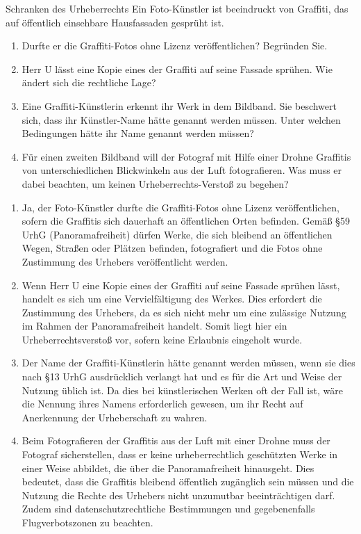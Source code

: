 \documentclass{article}
\begin{document}
\begin{exercise}{Schranken des Urheberrechts}
  Ein Foto-Künstler ist beeindruckt von Graffiti, das auf öffentlich einsehbare Hausfassaden gesprüht ist.
  \begin{enumerate}
    \item Durfte er die Graffiti-Fotos ohne Lizenz veröffentlichen? Begründen Sie.
    \item Herr U lässt eine Kopie eines der Graffiti auf seine Fassade sprühen. Wie ändert sich die rechtliche Lage?
    \item Eine Graffiti-Künstlerin erkennt ihr Werk in dem Bildband. Sie beschwert sich, dass ihr Künstler-Name hätte genannt werden müssen. Unter welchen Bedingungen hätte ihr Name genannt werden müssen?
    \item Für einen zweiten Bildband will der Fotograf mit Hilfe einer Drohne Graffitis von unterschiedlichen Blickwinkeln aus der Luft fotografieren. Was muss er dabei beachten, um keinen Urheberrechts-Verstoß zu begehen?
  \end{enumerate}

  \begin{solution}
    \begin{enumerate}
      \item Ja, der Foto-Künstler durfte die Graffiti-Fotos ohne Lizenz veröffentlichen, sofern die Graffitis sich dauerhaft an öffentlichen Orten befinden. Gemäß §59 UrhG (Panoramafreiheit) dürfen Werke, die sich bleibend an öffentlichen Wegen, Straßen oder Plätzen befinden, fotografiert und die Fotos ohne Zustimmung des Urhebers veröffentlicht werden.
      \item Wenn Herr U eine Kopie eines der Graffiti auf seine Fassade sprühen lässt, handelt es sich um eine Vervielfältigung des Werkes. Dies erfordert die Zustimmung des Urhebers, da es sich nicht mehr um eine zulässige Nutzung im Rahmen der Panoramafreiheit handelt. Somit liegt hier ein Urheberrechtsverstoß vor, sofern keine Erlaubnis eingeholt wurde.
      \item Der Name der Graffiti-Künstlerin hätte genannt werden müssen, wenn sie dies nach §13 UrhG ausdrücklich verlangt hat und es für die Art und Weise der Nutzung üblich ist. Da dies bei künstlerischen Werken oft der Fall ist, wäre die Nennung ihres Namens erforderlich gewesen, um ihr Recht auf Anerkennung der Urheberschaft zu wahren.
      \item Beim Fotografieren der Graffitis aus der Luft mit einer Drohne muss der Fotograf sicherstellen, dass er keine urheberrechtlich geschützten Werke in einer Weise abbildet, die über die Panoramafreiheit hinausgeht. Dies bedeutet, dass die Graffitis bleibend öffentlich zugänglich sein müssen und die Nutzung die Rechte des Urhebers nicht unzumutbar beeinträchtigen darf. Zudem sind datenschutzrechtliche Bestimmungen und gegebenenfalls Flugverbotszonen zu beachten.
    \end{enumerate}
  \end{solution}
\end{exercise}
\end{document}
